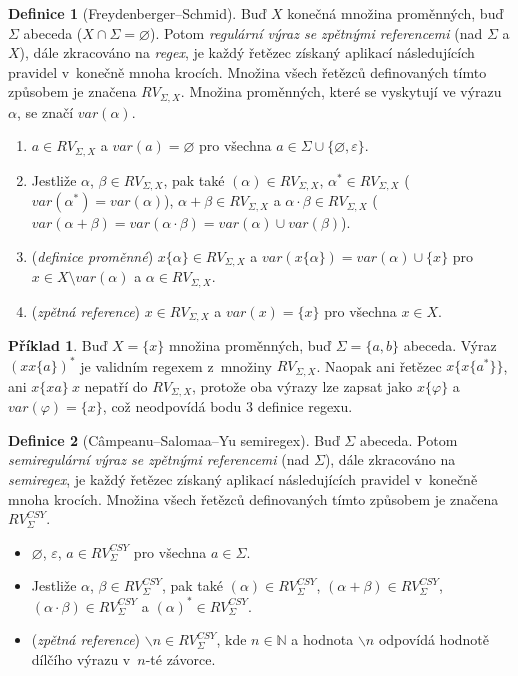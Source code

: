 \documentclass[thesis=B,czech]{FITthesis}[2019/12/23]
\theoremstyle{definition}
\newtheorem{definition}{Definice}[chapter]
\newtheorem{example}{Příklad}[chapter]
\begin{document}
\begin{definition}[Freydenberger--Schmid]
Buď $X$ konečná množina proměnných, buď $\Sigma$ abeceda ($X\cap\Sigma = \varnothing$). Potom \emph{regulární výraz se zpětnými referencemi} (nad $\Sigma$ a $X$), dále zkracováno na \emph{regex}, je každý řetězec získaný aplikací následujících pravidel v~konečně mnoha krocích. 
Množina všech řetězců definovaných tímto způsobem je značena $RV_{\Sigma, X}$. Množina proměnných, které se vyskytují ve výrazu $\alpha$, se značí $var(\alpha)$.
\begin{enumerate}
	\item{$a \in RV_{\Sigma, X}$ a $var(a) = \varnothing$ pro všechna $a \in \Sigma\cup\{\varnothing, \varepsilon\}$.}
	\item{Jestliže $\alpha$, $\beta \in RV_{\Sigma, X}$, pak také  $(\alpha) \in RV_{\Sigma, X}$, $\alpha^\ast \in RV_{\Sigma, X}$ ($var(\alpha^\ast)=var(\alpha)$),  $\alpha + \beta \in RV_{\Sigma, X}$ a $\alpha \cdot \beta \in RV_{\Sigma, X}$ ($var(\alpha + \beta)=var(\alpha \cdot \beta)=var(\alpha)\cup var(\beta)$).}
	\item(\emph{definice proměnné}){ $x \{ \alpha \} \in RV_{\Sigma, X}$ a $var(x \{\alpha\}) = var(\alpha)\cup\{x\}$ pro $x \in X \setminus var(\alpha)$ a $\alpha \in RV_{\Sigma, X}$.}
	\item(\emph{zpětná reference}){ $x \in RV_{\Sigma, X}$ a $var(x) = \{x\}$ pro všechna $x \in X$. \cite{schmidref}}
\end{enumerate}
\end{definition}

\begin{example} 
Buď $X=\{x\}$ množina proměnných, buď $\Sigma=\{a, b\}$ abeceda. Výraz $(x x\{a\})^\ast$ je validním regexem z~množiny $RV_{\Sigma, X}$. Naopak ani řetězec $x\{x\{a^\ast\}\}$, ani $x\{xa\} \ x$ nepatří do $RV_{\Sigma, X}$, protože oba výrazy lze zapsat jako $x\{\varphi\}$ a $var(\varphi) = \{x\}$, což neodpovídá bodu 3 definice regexu.
\end{example}

\begin{definition}[Câmpeanu--Salomaa--Yu semiregex]
Buď $\Sigma$ abeceda. Potom \emph{semiregulární výraz se zpětnými referencemi} (nad $\Sigma$), dále zkracováno na \emph{semiregex}, je každý řetězec získaný aplikací následujících pravidel v~konečně mnoha krocích. Množina všech řetězců definovaných tímto způsobem je značena $RV_{\Sigma}^{CSY}$.
\begin{itemize}
	\item{$\varnothing$, $\varepsilon$, $a \in RV_{\Sigma}^{CSY}$ pro všechna $a \in \Sigma$.}
	\item{Jestliže $\alpha$, $\beta \in RV_{\Sigma}^{CSY}$, pak také $(\alpha) \in RV_{\Sigma}^{CSY}$, $\left(\alpha + \beta \right) \in RV_{\Sigma}^{CSY}$, $\left(\alpha \cdot \beta \right)\in RV_{\Sigma}^{CSY}$ a $(\alpha)^\ast \in RV_{\Sigma}^{CSY}$.}
	\item(\emph{zpětná reference}){ $\backslash n \in RV_{\Sigma}^{CSY}$, kde $n \in \mathbb{N} $ a hodnota $\backslash n$ odpovídá hodnotě dílčího výrazu v~$n$-té závorce. \cite{campeanu}} 
\end{itemize}
\end{definition}
\end{document}
